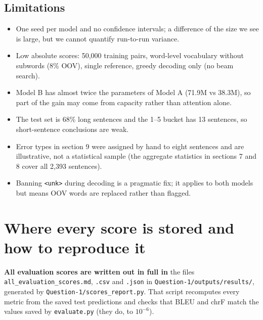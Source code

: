 \documentclass[10pt,a4paper]{article}
\newcommand{\code}[1]{\texttt{#1}}
\newcommand{\unk}{\texttt{<unk>}}
\begin{document}
\subsection*{Limitations}
\begin{itemize}
\item One seed per model and no confidence intervals; a difference of the size we see is large, but we cannot quantify run-to-run variance.
\item Low absolute scores: 50,000 training pairs, word-level vocabulary without subwords (8\% OOV), single reference, greedy decoding only (no beam search).
\item Model B has almost twice the parameters of Model A (71.9M vs 38.3M), so part of the gain may come from capacity rather than attention alone.
\item The test set is 68\% long sentences and the 1--5 bucket has 13 sentences, so short-sentence conclusions are weak.
\item Error types in section 9 were assigned by hand to eight sentences and are illustrative, not a statistical sample (the aggregate statistics in
sections 7 and 8 cover all 2,393 sentences).
\item Banning \unk{} during decoding is a pragmatic fix; it applies to both models but means OOV words are replaced rather than flagged.
\end{itemize}

\section{Where every score is stored and how to reproduce it}
\textbf{All evaluation scores are written out in full in} the files \code{all\_evaluation\_scores.md}, \code{.csv} and \code{.json} in \code{Question-1/outputs/results/}, generated by
\code{Question-1/scores\_report.py}. That script recomputes every metric from the saved test predictions and checks that BLEU and chrF match the
values saved by \code{evaluate.py} (they do, to $10^{-6}$).
\end{document}
